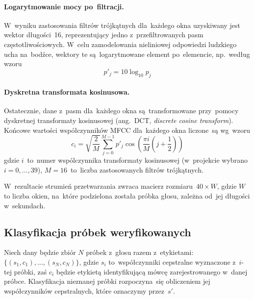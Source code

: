 \documentclass[11pt,a4paper]{article}
\begin{document}
\paragraph{Logarytmowanie mocy po~filtracji.}
W~wyniku zastosowania filtrów trójkątnych dla~każdego okna uzyskiwany jest wektor długości~16, reprezentujący jedno z~przefiltrowanych pasm częstotliwościowych.
W~celu zamodelowania nieliniowej odpowiedzi ludzkiego ucha na~bodźce, wektory te są~logarytmowane element po~elemencie, np.~według wzoru
$$ p'_j = 10 \log_{10} p_j $$

\paragraph{Dyskretna transformata kosinusowa.}
Ostatecznie, dane z~pasm dla~każdego okna są~transformowane przy~pomocy dyskretnej transformaty kosinusowej (ang.~DCT, \emph{discrete cosine transform}).
Końcowe wartości współczynników MFCC dla~każdego okna liczone~są wg~wzoru
$$ c_i = \sqrt{\frac{2}{M}} \sum_{j=0}^{M - 1} p'_j \cos \left( \frac{\pi i}{M} \left(j + \frac{1}{2} \right) \right) $$
gdzie $i$~to~numer wspólczynnika transformaty kosinusowej (w~projekcie wybrano $i = 0, \dots, 39$), $M = 16$~to~liczba zastosowanych filtrów trójkątnych.

W~rezultacie strumień przetwarzania zwraca macierz rozmiaru~$40 \times W$, gdzie $W$ to liczba okien, na~które podzielona została próbka głosu, zależna od~jej długości w~sekundach.

\subsection{Klasyfikacja próbek weryfikowanych}
\label{subsec:classification}

Niech dany będzie zbiór $N$ próbek z~głosu razem z~etykietami: $\{ (s_1, c_1), \dots, (s_N, c_N) \}$, gdzie $s_i$ to~współczynniki cepstralne wyznaczone z~$i$-tej próbki, zaś $c_i$ będzie etykietą identyfikującą mówcę zarejestrowanego w~danej próbce.
Klasyfikacja nieznanej próbki rozpoczyna~się obliczeniem jej współczynników cepstralnych, które oznaczymy przez~$s'$.
\end{document}
